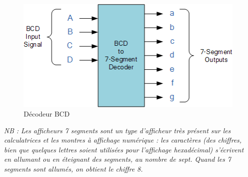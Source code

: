 \documentclass[12pt]{tdtp}
\begin{document}
\begin{figure}[h!]
\begin{center}
\includegraphics[scale=0.5]{images/74LS48.png}
\caption{Décodeur BCD}
\label{74HS48}
\end{center}
\end{figure}

\textit{NB : Les afficheurs 7 segments sont un type d'afficheur très présent sur les calculatrices et les montres à affichage numérique : les caractères (des chiffres, bien que quelques lettres soient utilisées pour l'affichage hexadécimal) s'écrivent en allumant ou en éteignant des segments, au nombre de sept. Quand les 7 segments sont allumés, on obtient le chiffre 8.}

\end{document}
